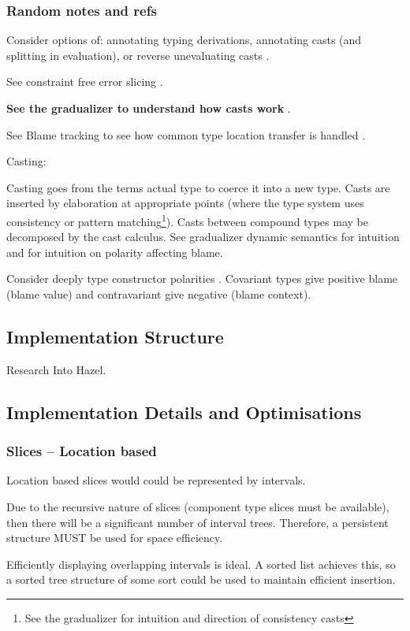 \subsubsection{Random notes and refs}
Consider options of: annotating typing derivations, annotating casts (and splitting in evaluation), or reverse unevaluating casts \cite{FunctionalProgExplain}.\par
See constraint free error slicing \cite{ConstraintFreeErrSlice}.\par
\textbf{See the gradualizer to understand how casts work }\cite{Gradualizer}.\par
See Blame tracking to see how common type location transfer is handled \cite{Blame}.\\ \par
Casting:\par 
Casting goes from the terms actual type to coerce it into a new type. Casts are inserted by elaboration at appropriate points (where the type system uses consistency or pattern matching\footnote{See the gradualizer for intuition and direction of consistency casts}). Casts between compound types may be decomposed by the cast calculus. See gradualizer dynamic semantics \cite{GradualizerDynamic} for intuition and \cite{Blame} for intuition on polarity affecting blame. \par 
Consider deeply type constructor polarities \cite[pg.473]{TAPL}. Covariant types give positive blame (blame value) and contravariant give negative (blame context).


\subsection{Implementation Structure}
Research Into Hazel.

\subsection{Implementation Details and Optimisations}
\subsubsection{Slices -- Location based}
Location based slices would could be represented by intervals.\par 
Due to the recursive nature of slices (component type slices must be available), then there will be a significant number of interval trees. Therefore, a persistent structure MUST be used for space efficiency.\par 
Efficiently displaying overlapping intervals is ideal. A sorted list achieves this, so a sorted  tree structure of some sort could be used to maintain efficient insertion.


